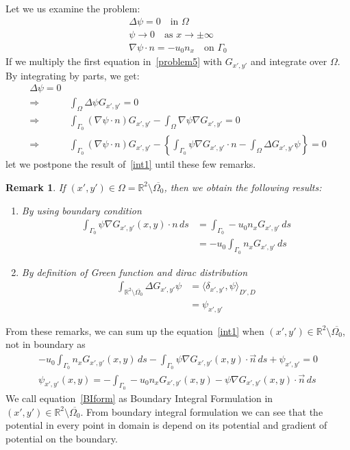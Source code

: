 \documentclass[a4paper,12pt]{article}
\newtheorem{remark}{Remark}
\newcommand{\integ}[3]{%
\ensuremath{\displaystyle{\int^{#2}_{#1} #3}}}
\begin{document}
Let we us examine the problem:
\begin{align}  \label{problem5}
\Delta \psi=0 \quad \text{in } \Omega\\
\psi \to 0 \quad \text{as } x\to\pm\infty\\
\nabla\psi \cdot n = -u_0 n_x \quad \text{on } \Gamma_0 
\end{align}
If we multiply the first equation in~\eqref{problem5} with $G_{x',y'}$ and integrate over 
$\Omega$. By integrating by parts, we get:
\begin{align}
\Delta\psi=0\\
\Rightarrow&\integ{\Omega}{}{ \Delta \psi G_{x',y'}}=0\\
\Rightarrow& \integ{\Gamma_0}{}{(\nabla \psi \cdot n)G_{x',y'}}-\integ{\Omega}{}
{\nabla\psi \nabla G_{x',y'}}=0\\
\Rightarrow&\integ{\Gamma_0}{}{(\nabla \psi \cdot n)G_{x',y'}}-
\left\{\integ{\Gamma_0}{}{\psi \nabla G_{x',y'}\cdot n}-
\integ{\Omega}{}{\Delta G_{x',y'} \psi}\right\}=0 \label{int1}
\end{align}
let we postpone the result of~\eqref{int1} until these few remarks.
\begin{remark}
 If $(x',y')\in \Omega=\mathbb{R}^2 \setminus\overline{\Omega_0}$, then we obtain the following results:
\begin{enumerate}
 \item By using boundary condition
\begin{align}
 \integ{\Gamma_0}{}{\psi \nabla G_{x',y'}(x,y)\cdot n \, ds}&=\integ{\Gamma_0}{}{-u_0 n_x G_{x',y'} \, ds}\\
&= -u_0 \integ{\Gamma_0}{}{n_x G_{x',y'} \, ds}
\end{align}
\item By definition of Green function and dirac distribution
\begin{align}
 \integ{\mathbb{R}^2 \setminus \overline{\Omega_0}}{}{\Delta G_{x',y'} \psi }&=
{\langle\delta_{x',y'}{,} \psi\rangle}_{D',D}\\
&=\psi_{x',y'}
\end{align}
\end{enumerate}
\end{remark}
From these remarks, we can sum up the equation~\eqref{int1} 
when $(x',y')\in\mathbb{R}^2\setminus\overline{\Omega_0}$, not in boundary as
\begin{align}
 -u_0 \integ{\Gamma_0}{}{n_x G_{x',y'}(x,y) \, ds}-
\integ{\Gamma_0}{}{\psi\nabla G_{x',y'}(x,y)\cdot \vec{n} \, ds}+\psi_{x',y'}=0\\
\psi_{x',y'}(x,y)=-\integ{\Gamma_0}{}{-u_0 n_x G_{x',y'}(x,y) -\psi\nabla G_{x',y'}(x,y)\cdot \vec{n} \, ds} \label{BIform}
\end{align}
We call equation~\eqref{BIform} as Boundary Integral Formulation in $(x',y')\in \mathbb{R}^2\setminus\overline{\Omega_0}$. From boundary integral formulation we can see that the potential in 
every point in domain is depend on its potential and gradient of potential on the boundary.
\end{document}

